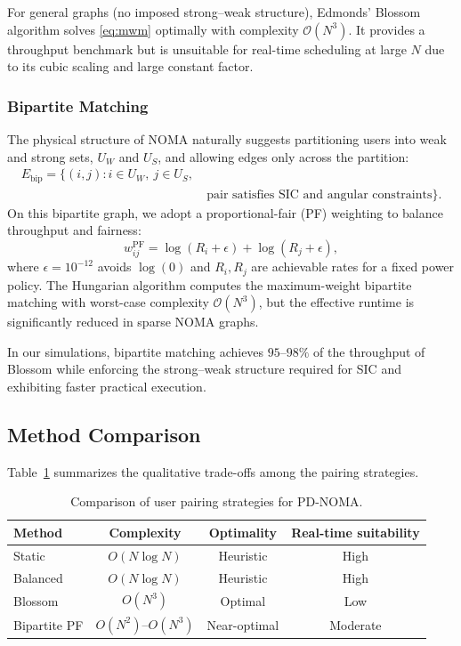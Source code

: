 For general graphs (no imposed strong–weak structure), Edmonds’ Blossom algorithm \cite{edmonds1965} solves \eqref{eq:mwm} optimally with complexity $\mathcal{O}(N^3)$. It provides a throughput benchmark but is unsuitable for real-time scheduling at large $N$ due to its cubic scaling and large constant factor.

\subsubsection{Bipartite Matching}

The physical structure of NOMA naturally suggests partitioning users into weak and strong sets, $U_W$ and $U_S$, and allowing edges only across the partition:
\begin{equation}
\begin{aligned}
E_{\text{bip}} = \{(i,j) : i \in U_W,\ j \in U_S,\ \\
&\text{pair satisfies SIC and angular constraints}\}.
\end{aligned}
\end{equation}
On this bipartite graph, we adopt a proportional-fair (PF) weighting to balance throughput and fairness:
\begin{equation}
w_{ij}^{\text{PF}} = \log(R_i + \epsilon) + \log(R_j + \epsilon),
\end{equation}
where $\epsilon = 10^{-12}$ avoids $\log(0)$ and $R_i,R_j$ are achievable rates for a fixed power policy. The Hungarian algorithm computes the maximum-weight bipartite matching with worst-case complexity $\mathcal{O}(N^3)$, but the effective runtime is significantly reduced in sparse NOMA graphs.

In our simulations, bipartite matching achieves $95$–$98\%$ of the throughput of Blossom while enforcing the strong–weak structure required for SIC and exhibiting faster practical execution.

\subsection{Method Comparison}

Table~\ref{tab:method_comparison} summarizes the qualitative trade-offs among the pairing strategies.

\begin{table}[t]
\centering
\caption{Comparison of user pairing strategies for PD-NOMA.}
\label{tab:method_comparison}
\begin{tabular}{lccc}
\toprule
\textbf{Method}   & \textbf{Complexity}      & \textbf{Optimality} & \textbf{Real-time suitability} \\
\midrule
Static          & $O(N \log N)$            & Heuristic           & High      \\
Balanced        & $O(N \log N)$            & Heuristic           & High      \\
Blossom         & $O(N^3)$                 & Optimal             & Low       \\
Bipartite PF    & $O(N^2)$–$O(N^3)$        & Near-optimal        & Moderate  \\
\bottomrule
\end{tabular}
\end{table}

